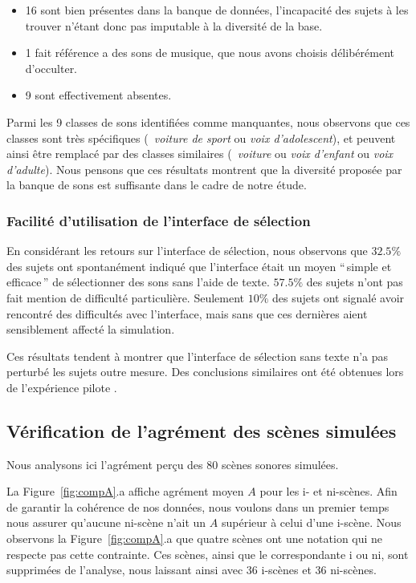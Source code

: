 \begin{itemize}
\item  16 sont bien présentes dans la banque de données, l'incapacité des sujets à les trouver n'étant donc pas imputable à la diversité de la base.
\item 1 fait référence a des sons de musique, que nous avons choisis délibérément d'occulter.
\item 9 sont effectivement absentes.  
\end{itemize}

Parmi les 9 classes de sons identifiées comme manquantes, nous observons que ces classes sont très spécifiques (\eg~\emph{voiture de sport} ou \emph{voix d'adolescent}), et peuvent ainsi être remplacé par des classes similaires (\eg~\emph{voiture} ou \emph{voix d'enfant} ou \emph{voix d'adulte}). Nous pensons que ces résultats montrent que la diversité proposée par la banque de sons est suffisante dans le cadre de notre étude.

\subsubsection{Facilité d'utilisation de l'interface de sélection}

En considérant les retours sur l'interface de sélection, nous observons que $32.5\%$ des sujets ont spontanément indiqué que l'interface était un moyen ``\,simple et efficace\,'' de sélectionner des sons sans l'aide de texte. $57.5\%$ des sujets n'ont pas fait mention de difficulté particulière. Seulement $10\%$ des sujets ont signalé avoir rencontré des difficultés avec l'interface, mais sans que ces dernières aient sensiblement affecté la simulation.

Ces résultats tendent à montrer que l'interface de sélection sans texte n'a pas perturbé les sujets outre mesure. Des conclusions similaires ont été obtenues lors de l'expérience pilote \citep{lafay2013atiam,lafay2014new}. \\


\subsection{Vérification de l'agrément des scènes simulées}

Nous analysons ici l'agrément perçu des $80$ scènes sonores simulées. 

La Figure~\ref{fig:compA}.a affiche agrément moyen $A$ pour les i- et ni-scènes. Afin de garantir la cohérence de nos données, nous voulons dans un premier temps nous assurer qu'aucune ni-scène n'ait un $A$ supérieur à celui d'une i-scène. Nous observons la Figure~\ref{fig:compA}.a que quatre scènes ont une notation qui ne respecte pas cette contrainte. Ces scènes, ainsi que le correspondante i ou ni, sont supprimées de l'analyse, nous laissant ainsi avec 36 i-scènes et 36 ni-scènes.

